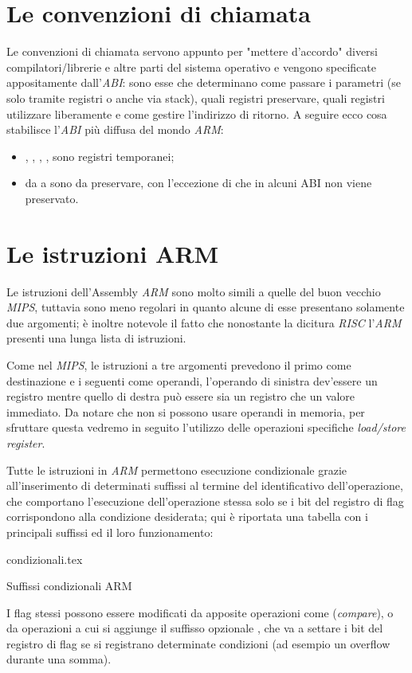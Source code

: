 \documentclass[class=book, crop=false, oneside]{standalone}
\begin{document}
\section{Le convenzioni di chiamata}
Le convenzioni di chiamata servono appunto per "mettere d'accordo" diversi compilatori/librerie e altre parti del sistema operativo e vengono specificate appositamente dall'\emph{ABI}: sono esse che determinano come passare i parametri (se solo tramite registri o anche via stack), quali registri preservare, quali registri utilizzare liberamente e come gestire l'indirizzo di ritorno. A seguire ecco cosa stabilisce l'\emph{ABI} più diffusa del mondo \emph{ARM}:
\begin{itemize}
	\item {}, , , ,  sono registri temporanei;
	\item da  a  sono da preservare, con l'eccezione di  che in alcuni ABI non viene preservato.
\end{itemize}

\section{Le istruzioni ARM}
Le istruzioni dell'Assembly \emph{ARM} sono molto simili a quelle del buon vecchio \emph{MIPS}, tuttavia sono meno regolari in quanto alcune di esse presentano solamente due argomenti; è inoltre notevole il fatto che nonostante la dicitura \emph{RISC} l'\emph{ARM} presenti una lunga lista di istruzioni.

Come nel \emph{MIPS}, le istruzioni a tre argomenti prevedono il primo come destinazione e i seguenti come operandi, l'operando di sinistra dev'essere un registro mentre quello di destra può essere sia un registro che un valore immediato. Da notare che non si possono usare operandi in memoria, per sfruttare questa vedremo in seguito l'utilizzo delle operazioni specifiche \emph{load/store register}.

Tutte le istruzioni in \emph{ARM} permettono esecuzione condizionale grazie all'inserimento di determinati suffissi al termine del identificativo dell'operazione, che comportano l'esecuzione dell'operazione stessa solo se i bit del registro di flag corrispondono alla condizione desiderata; qui è riportata una tabella con i principali suffissi ed il loro funzionamento:

\vspace{0.4cm}
\begin{table}[H]
	\centering
	{condizionali.tex}
	\caption{Suffissi condizionali ARM}
\end{table}
I flag stessi possono essere modificati da apposite operazioni come  (\emph{compare}), o da operazioni a cui si aggiunge il suffisso opzionale , che va a settare i bit del registro di flag se si registrano determinate condizioni (ad esempio un overflow durante una somma).
\end{document}
